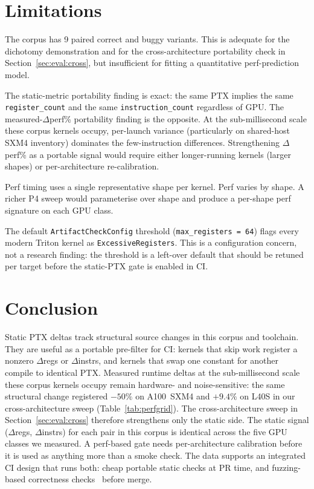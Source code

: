 \documentclass[runningheads]{llncs}
\begin{document}
\section{Limitations}
\label{sec:limitations}

The corpus has 9 paired correct and buggy variants. This is adequate
for the dichotomy demonstration and for the cross-architecture
portability check in Section~\ref{sec:eval:cross}, but insufficient
for fitting a quantitative perf-prediction model.

The static-metric portability finding is exact: the same PTX implies
the same \texttt{register\_count} and the same \texttt{instruction\_count}
regardless of GPU. The measured-$\Delta$perf\% portability finding is
the opposite. At the sub-millisecond scale these corpus kernels occupy,
per-launch variance (particularly on shared-host SXM4 inventory)
dominates the few-instruction differences. Strengthening $\Delta$perf\%
as a portable signal would require either longer-running kernels (larger
shapes) or per-architecture re-calibration.

Perf timing uses a single representative shape per kernel. Perf varies
by shape. A richer P4 sweep would parameterise over shape and produce
a per-shape perf signature on each GPU class.

The default \texttt{ArtifactCheckConfig} threshold
(\texttt{max\_registers = 64}) flags every modern Triton kernel as
\texttt{ExcessiveRegisters}. This is a configuration concern, not a
research finding: the threshold is a left-over default that should
be retuned per target before the static-PTX gate is enabled in CI.

\section{Conclusion}
\label{sec:conclusion}

Static PTX deltas track structural source changes in this corpus
and toolchain. They are useful as a portable pre-filter for CI:
kernels that skip work register a nonzero $\Delta$regs or
$\Delta$instrs, and kernels that swap one constant for another
compile to identical PTX. Measured runtime deltas at the
sub-millisecond scale these corpus kernels occupy remain hardware-
and noise-sensitive: the same structural change registered $-50\%$
on A100~SXM4 and $+9.4\%$ on L40S in our cross-architecture sweep
(Table~\ref{tab:perfgrid}). The cross-architecture sweep in
Section~\ref{sec:eval:cross} therefore strengthens only the static
side. The static signal ($\Delta$regs, $\Delta$instrs) for each pair
in this corpus is identical across the five GPU classes we measured.
A perf-based gate needs per-architecture calibration before it is
used as anything more than a smoke check. The data supports an
integrated CI design that runs both: cheap portable static checks at
PR time, and fuzzing-based correctness
checks~\cite{gpuemuP1} before merge.
\end{document}
